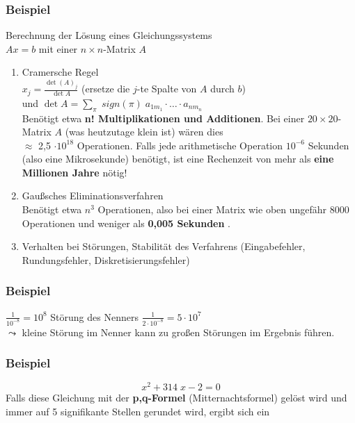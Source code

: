 \documentclass[ngerman,fontsize=11pt, paper=a4, parskip=half, titlepage=true, toc=bib]{scrbook}
\theoremstyle{definition}
\theoremstyle{plain}
\begin{document}
\subsubsection{Beispiel}
Berechnung der Lösung eines Gleichungssystems 
\\ $ A x=b$ mit einer $n \times n$-Matrix $A$
\begin{enumerate}
\item Cramersche Regel\\
  $x_j = \frac{\det  (A)_j}{\det A}$ (ersetze die $j$-te
  Spalte von $A$ durch $b$)\\
  und $\det A = \sum_{\pi} \; sign (\pi) \; a_{1 m_1} \cdot \ldots \cdot a_{n
    m_n}$\\
  Benötigt etwa \textbf{n! Multiplikationen und Additionen}.
  Bei einer $20 \times 20$-Matrix $A$ (was
  heutzutage klein ist) wären dies \\
  $\approx$ 2,5
  $\cdot 10^{18}$ Operationen. Falls jede
  arithmetische Operation $10^{-6}$ Sekunden (also
  eine Mikrosekunde) benötigt, ist eine Rechenzeit
  von mehr als \textbf{eine Millionen Jahre} nötig!
\item Gaußsches Eliminationsverfahren\\
  Benötigt etwa $n^3$ Operationen, also bei einer Matrix wie oben
  ungefähr 8000 Operationen und weniger als \textbf{0,005 Sekunden}
  \cite[siehe auch][]{golubortega}.
\item Verhalten bei Störungen, Stabilität des Verfahrens
  (Eingabefehler, Rundungsfehler, Diskretisierungsfehler)\\
\end{enumerate}

\subsubsection{Beispiel}
$\frac{1}{10^{-8}} = 10^8$ Störung des Nenners $\frac{1}{2 \cdot 10^{-8}} = 5 \cdot
10^7$\\
$\leadsto$ kleine Störung im Nenner kann zu großen
Störungen im Ergebnis führen.
\\

\subsubsection{Beispiel}
$$x^2 + 314 \; x - 2 = 0$$
Falls diese Gleichung mit der \textbf{p,q-Formel} (Mitternachtsformel)
gelöst wird und immer auf 5 signifikante Stellen gerundet wird,
ergibt sich ein
\end{document}
